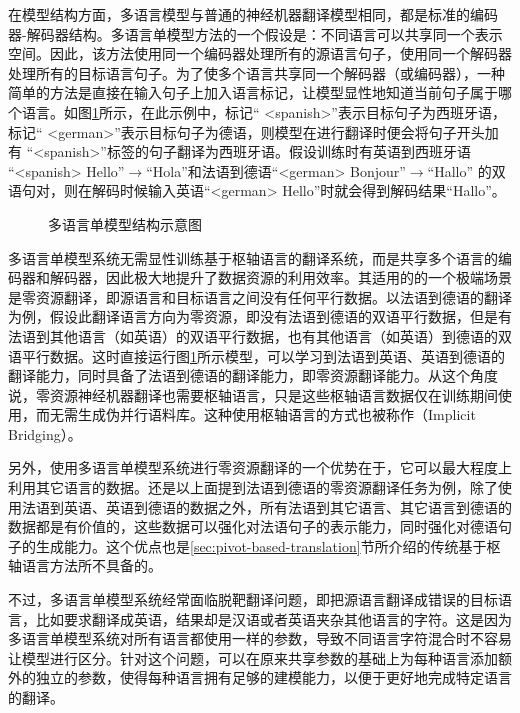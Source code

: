 \parinterval 在模型结构方面，多语言模型与普通的神经机器翻译模型相同，都是标准的编码器-解码器结构。多语言单模型方法的一个假设是：不同语言可以共享同一个表示空间。因此，该方法使用同一个编码器处理所有的源语言句子，使用同一个解码器处理所有的目标语言句子。为了使多个语言共享同一个解码器（或编码器），一种简单的方法是直接在输入句子上加入语言标记，让模型显性地知道当前句子属于哪个语言。如图\ref{fig:16-15}所示，在此示例中，标记“ <spanish>”表示目标句子为西班牙语，标记“ <german>”表示目标句子为德语，则模型在进行翻译时便会将句子开头加有 “<spanish>”标签的句子翻译为西班牙语。假设训练时有英语到西班牙语 “<spanish> Hello”$\to$“Hola”和法语到德语“<german> Bonjour”$\to$“Hallo” 的双语句对，则在解码时候输入英语“<german> Hello”时就会得到解码结果“Hallo”。
\begin{figure}[h]
\centering

\caption{多语言单模型结构示意图}
\label{fig:16-15}
\end{figure}

\parinterval 多语言单模型系统无需显性训练基于枢轴语言的翻译系统，而是共享多个语言的编码器和解码器，因此极大地提升了数据资源的利用效率。其适用的的一个极端场景是零资源翻译，即源语言和目标语言之间没有任何平行数据。以法语到德语的翻译为例，假设此翻译语言方向为零资源，即没有法语到德语的双语平行数据，但是有法语到其他语言（如英语）的双语平行数据，也有其他语言（如英语）到德语的双语平行数据。这时直接运行图\ref{fig:16-15}所示模型，可以学习到法语到英语、英语到德语的翻译能力，同时具备了法语到德语的翻译能力，即零资源翻译能力。从这个角度说，零资源神经机器翻译也需要枢轴语言，只是这些枢轴语言数据仅在训练期间使用，而无需生成伪并行语料库。这种使用枢轴语言的方式也被称作{\small{}}（Implicit Bridging）。

\parinterval 另外，使用多语言单模型系统进行零资源翻译的一个优势在于，它可以最大程度上利用其它语言的数据。还是以上面提到法语到德语的零资源翻译任务为例，除了使用法语到英语、英语到德语的数据之外，所有法语到其它语言、其它语言到德语的数据都是有价值的，这些数据可以强化对法语句子的表示能力，同时强化对德语句子的生成能力。这个优点也是\ref{sec:pivot-based-translation}节所介绍的传统基于枢轴语言方法所不具备的。

\parinterval 不过，多语言单模型系统经常面临脱靶翻译问题，即把源语言翻译成错误的目标语言，比如要求翻译成英语，结果却是汉语或者英语夹杂其他语言的字符。这是因为多语言单模型系统对所有语言都使用一样的参数，导致不同语言字符混合时不容易让模型进行区分。针对这个问题，可以在原来共享参数的基础上为每种语言添加额外的独立的参数，使得每种语言拥有足够的建模能力，以便于更好地完成特定语言的翻译。

